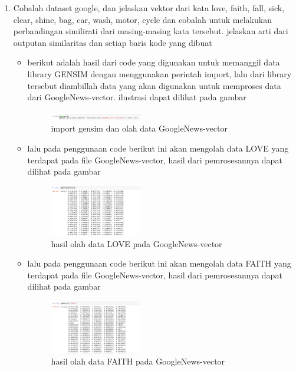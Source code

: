 \begin{enumerate}
    \item Cobalah dataset google, dan jelaskan vektor dari kata love, faith, fall, sick, clear, shine, bag, car, wash, motor, cycle dan cobalah untuk melakukan perbandingan similirati dari masing-masing kata tersebut. jelaskan arti dari outputan similaritas dan setiap baris kode yang dibuat
    \begin{itemize}
        \item berikut adalah hasil dari code yang digunakan untuk memanggil data library GENSIM dengan menggunakan perintah import, lalu dari library tersebut diambillah data yang akan digunakan untuk memproses data dari GoogleNews-vector. ilustrasi dapat dilihat pada gambar
        \begin{figure}[H]
            \includegraphics[width=4cm]{figures/1174096/tugas5/praktek1-1.PNG}
            \centering
            \caption{import gensim dan olah data GoogleNews-vector}
        \end{figure}
        
        \item lalu pada penggunaan code berikut ini akan mengolah data LOVE yang terdapat pada file GoogleNews-vector, hasil dari pemrosesannya dapat dilihat pada gambar
        \begin{figure}[H]
            \includegraphics[width=4cm]{figures/1174096/tugas5/praktek1-2.PNG}
            \centering
            \caption{hasil olah data LOVE pada GoogleNews-vector}
        \end{figure}
        
        \item  lalu pada penggunaan code berikut ini akan mengolah data FAITH yang terdapat pada file GoogleNews-vector, hasil dari pemrosesannya dapat dilihat pada gambar
        \begin{figure}[H]
            \includegraphics[width=4cm]{figures/1174096/tugas5/praktek1-3.PNG}
            \centering
            \caption{hasil olah data FAITH pada GoogleNews-vector}
        \end{figure}
        

\end{itemize}
\end{enumerate}
